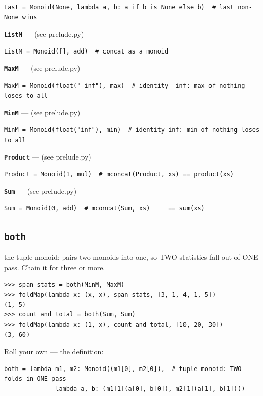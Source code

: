 \documentclass[10pt,letterpaper]{book}
\begin{document}
\begin{lstlisting}[style=ex]
Last = Monoid(None, lambda a, b: a if b is None else b)  # last non-None wins
\end{lstlisting}
\textbf{\texttt{ListM}}\label{def:ListM} --- (see prelude.py)

\begin{lstlisting}[style=ex]
ListM = Monoid([], add)  # concat as a monoid
\end{lstlisting}
\textbf{\texttt{MaxM}}\label{def:MaxM} --- (see prelude.py)

\begin{lstlisting}[style=ex]
MaxM = Monoid(float("-inf"), max)  # identity -inf: max of nothing loses to all
\end{lstlisting}
\textbf{\texttt{MinM}}\label{def:MinM} --- (see prelude.py)

\begin{lstlisting}[style=ex]
MinM = Monoid(float("inf"), min)  # identity inf: min of nothing loses to all
\end{lstlisting}
\textbf{\texttt{Product}}\label{def:Product} --- (see prelude.py)

\begin{lstlisting}[style=ex]
Product = Monoid(1, mul)  # mconcat(Product, xs) == product(xs)
\end{lstlisting}
\textbf{\texttt{Sum}}\label{def:Sum} --- (see prelude.py)

\begin{lstlisting}[style=ex]
Sum = Monoid(0, add)  # mconcat(Sum, xs)     == sum(xs)
\end{lstlisting}
\subsection{\texttt{both}}\label{def:both}
the tuple monoid: pairs two monoids into one, so TWO statistics fall out of ONE pass. Chain it for three or more.
\begin{lstlisting}[style=ex]
>>> span_stats = both(MinM, MaxM)
>>> foldMap(lambda x: (x, x), span_stats, [3, 1, 4, 1, 5])
(1, 5)
>>> count_and_total = both(Sum, Sum)
>>> foldMap(lambda x: (1, x), count_and_total, [10, 20, 30])
(3, 60)
\end{lstlisting}

Roll your own --- the definition:

\begin{lstlisting}[style=ex]
both = lambda m1, m2: Monoid((m1[0], m2[0]),  # tuple monoid: TWO folds in ONE pass
              lambda a, b: (m1[1](a[0], b[0]), m2[1](a[1], b[1])))
\end{lstlisting}
\end{document}
